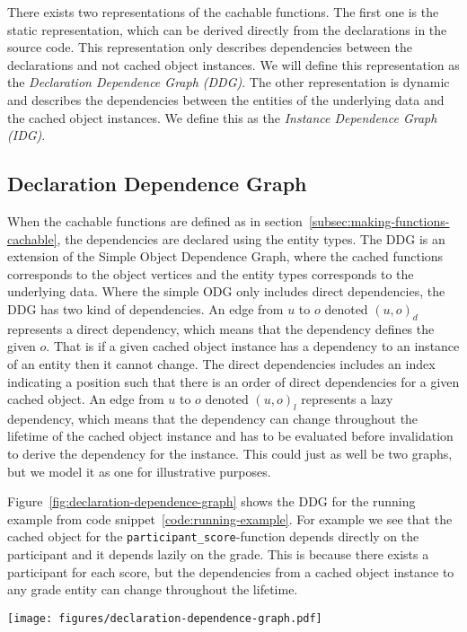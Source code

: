 There exists two representations of the cachable functions. The first one is the static representation, which can be derived directly from the declarations in the source code. This representation only describes dependencies between the declarations and not cached object instances. We will define this representation as the \emph{Declaration Dependence Graph (DDG)}. The other representation is dynamic and describes the dependencies between the entities of the underlying data and the cached object instances. We define this as the \emph{Instance Dependence Graph (IDG)}.

\subsection{Declaration Dependence Graph}
\label{subsec:declaration-dependence-graph}

When the cachable functions are defined as in section~\ref{subsec:making-functions-cachable}, the dependencies are declared using the entity types. The DDG is an extension of the Simple Object Dependence Graph, where the cached functions corresponds to the object vertices and the entity types corresponds to the underlying data. Where the simple ODG only includes direct dependencies, the DDG has two kind of dependencies. An edge from $u$ to $o$ denoted $(u, o)_d$ represents a direct dependency, which means that the dependency defines the given $o$. That is if a given cached object instance has a dependency to an instance of an entity then it cannot change. The direct dependencies includes an index indicating a position such that there is an order of direct dependencies for a given cached object. An edge from $u$ to $o$ denoted $(u, o)_l$ represents a lazy dependency, which means that the dependency can change throughout the lifetime of the cached object instance and has to be evaluated before invalidation to derive the dependency for the instance. This could just as well be two graphs, but we model it as one for illustrative purposes.

Figure~\ref{fig:declaration-dependence-graph} shows the DDG for the running example from code snippet~\ref{code:running-example}. For example we see that the cached object for the \verb$participant_score$-function depends directly on the participant and it depends lazily on the grade. This is because there exists a participant for each score, but the dependencies from a cached object instance to any grade entity can change throughout the lifetime.

\begin{figure*}[ht!]
  \centering
  \texttt{[image: figures/declaration-dependence-graph.pdf]}
  \caption{The Declaration Dependence Graph of the running example}
  \label{fig:declaration-dependence-graph}
\end{figure*}

